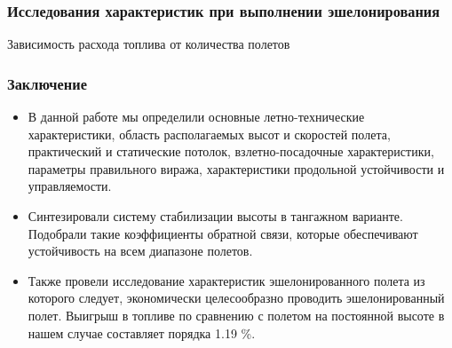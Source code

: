 \documentclass{beamer}
\begin{document}
\begin{frame}[t]
    \frametitle{Исследования характеристик при выполнении эшелонирования}
    \begin{center}
        Зависимость расхода топлива от количества полетов 
        \resizebox{0.7\textwidth}{!}{}
    \end{center}
\end{frame}

\begin{frame}[t]
    \frametitle{Заключение}
    \begin{itemize}
        \item В данной работе мы определили основные летно-технические характеристики,
            область располагаемых высот и скоростей полета, практический и статические
            потолок, взлетно-посадочные характеристики, параметры правильного виража, 
            характеристики продольной устойчивости и управляемости.
        \item Синтезировали систему стабилизации высоты в тангажном варианте.
            Подобрали такие коэффициенты обратной связи, которые обеспечивают
            устойчивость на всем диапазоне полетов.
        \item Также провели исследование характеристик эшелонированного полета
            из которого следует, экономически целесообразно проводить
            эшелонированный полет. Выигрыш в топливе по сравнению с полетом на
            постоянной высоте в нашем случае составляет порядка 1.19 \%. 
    \end{itemize}
\end{frame}
\end{document}
